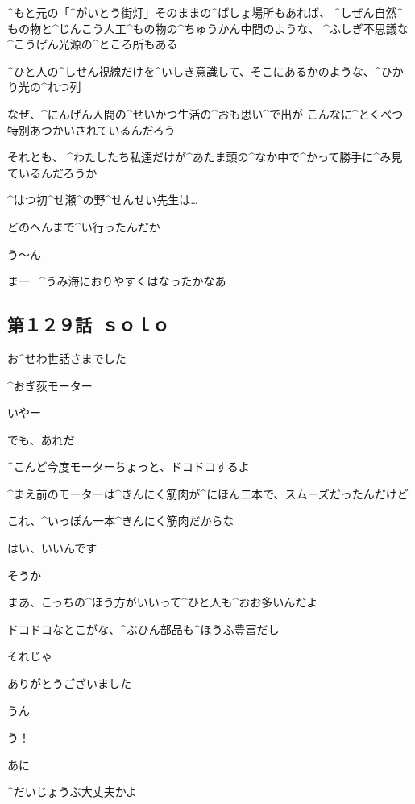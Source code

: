 \Ayase ^{もと}{元}の「^{がいとう}{街灯}」そのままの^{ばしょ}{場所}もあれば、
^{しぜん}{自然}^{もの}{物}と^{じんこう}{人工}^{もの}{物}の^{ちゅうかん}{中間}のような、
^{ふしぎ}{不思議}な^{こうげん}{光源}の^{ところ}{所}もある

\Ayase ^{ひと}{人}の^{しせん}{視線}だけを^{いしき}{意識}して、そこにあるかのような、^{ひかり}{光}の^{れつ}{列}

\page
\Ayase なぜ、^{にんげん}{人間}の^{せいかつ}{生活}の^{おも}{思}い^{で}{出}が
こんなに^{とくべつ}{特別}あつかいされているんだろう

\Ayase それとも、
^{わたしたち}{私達}だけが^{あたま}{頭}の^{なか}{中}で^{かって}{勝手}に^{み}{見}ているんだろうか

\page
\Ayase ^{はつ}{初}^{せ}{瀬}^{の}{野}^{せんせい}{先生}は…

\Ayase どのへんまで^{い}{行}ったんだか

\page
\Alpha う〜ん

\Alpha まー
\ ^{うみ}{海}におりやすくはなったかなあ


\subsection{第１２９話\ ｓｏｌｏ}

\page[132]
\Kokone お^{せわ}{世話}さまでした

\Sign ^{おぎ}{荻}モーター

\Person いやー

\Person でも、あれだ

\Person ^{こんど}{今度}モーターちょっと、ドコドコするよ

\Person ^{まえ}{前}のモーターは^{きんにく}{筋肉}が^{にほん}{二本}で、スムーズだったんだけど

\Person これ、^{いっぽん}{一本}^{きんにく}{筋肉}だからな

\Kokone はい、いいんです

\page
\Person そうか

\Person まあ、こっちの^{ほう}{方}がいいって^{ひと}{人}も^{おお}{多}いんだよ

\Person ドコドコなとこがな、^{ぶひん}{部品}も^{ほうふ}{豊富}だし

\Kokone それじゃ

\Kokone ありがとうございました

\Person うん

\page
\Kokone う！

\Person あに

\Person ^{だいじょうぶ}{大丈夫}かよ

